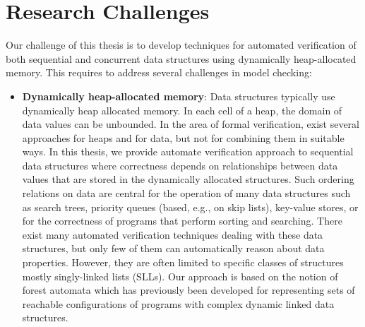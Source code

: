\section{Research Challenges}
Our challenge of this thesis is to develop techniques for automated verification of both sequential and concurrent data structures using dynamically heap-allocated memory. This requires to address several challenges in model checking:
\begin{itemize}
\item {\bf Dynamically heap-allocated memory}: Data structures typically use dynamically heap allocated memory. In each cell of a heap, the domain of data values can be unbounded.
   In the area of formal verification, exist several approaches for heaps and for data, but not for combining them in suitable ways. In this thesis, we provide automate verification approach to sequential data structures where correctness depends on relationships between data values that are stored in the dynamically allocated structures. Such ordering relations on data are central for the operation of many data structures such as search trees, priority queues (based, e.g., on skip lists), key-value stores, or for the correctness of programs that perform sorting and searching. 
 There exist many automated verification techniques dealing with these data structures, but only few of them can automatically reason about data properties. However, they are often limited to specific classes of structures  mostly singly-linked lists (SLLs). Our approach is based on the notion of forest automata which has previously been developed for representing sets of reachable configurations of programs with complex dynamic linked data structures.


\end{itemize}
